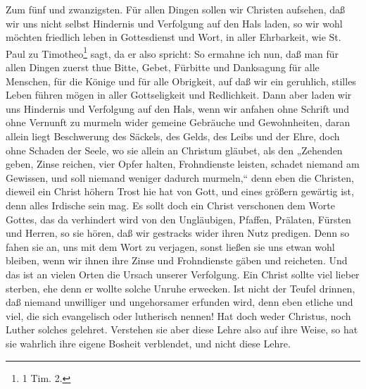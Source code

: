 Zum fünf und zwanzigsten. Für allen Dingen sollen wir Christen aufsehen, daß wir uns nicht selbst Hindernis und Verfolgung auf den Hals laden, so wir wohl möchten friedlich leben in Gottesdienst und Wort, in aller Ehrbarkeit, wie St. Paul zu Timotheo\footnote{1 Tim. 2.} sagt, da er also spricht: So ermahne ich nun, daß man für allen Dingen zuerst thue Bitte, Gebet, Fürbitte und Danksagung für alle Menschen, für die Könige und für alle Obrigkeit, auf daß wir ein geruhlich, stilles Leben führen mögen in aller Gottseligkeit und Redlichkeit. Dann aber laden wir uns Hindernis und Verfolgung auf den Hals, wenn wir anfahen ohne Schrift und ohne Vernunft zu murmeln wider gemeine Gebräuche und Gewohnheiten, daran allein liegt Beschwerung des Säckels, des Gelds, des Leibs und der Ehre, doch ohne Schaden der Seele, wo sie allein an Christum gläubet, als den „Zehenden geben, Zinse reichen, vier Opfer halten, Frohndienste leisten, schadet niemand am Gewissen, und soll niemand weniger dadurch murmeln,“ denn eben die Christen, dieweil ein Christ höhern Trost hie hat von Gott, und eines größern gewärtig ist, denn alles Irdische sein mag. Es sollt doch ein Christ verschonen dem Worte Gottes, das da verhindert wird von den Ungläubigen, Pfaffen, Prälaten, Fürsten und Herren, so sie hören, daß wir gestracks wider ihren Nutz predigen. Denn so fahen sie an, uns mit dem Wort zu verjagen, sonst ließen sie uns etwan wohl bleiben, wenn wir ihnen ihre Zinse und Frohndienste gäben und reicheten. Und das ist an vielen Orten die Ursach unserer Verfolgung. Ein Christ sollte viel lieber sterben, ehe denn er wollte solche Unruhe erwecken. Ist nicht der Teufel drinnen, daß niemand unwilliger und ungehorsamer erfunden wird, denn eben etliche und viel, die
sich evangelisch oder lutherisch nennen! Hat doch weder Christus, noch Luther solches gelehret. Verstehen sie aber diese Lehre also auf ihre Weise, so hat sie wahrlich ihre eigene Bosheit verblendet, und nicht diese Lehre.

